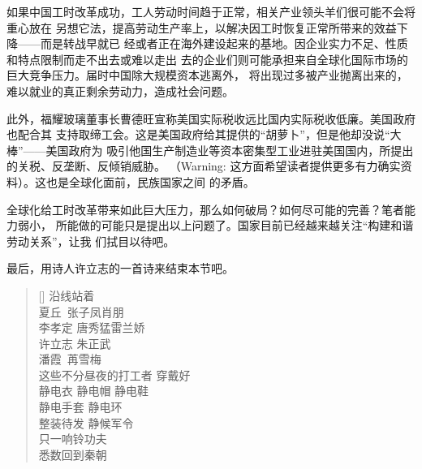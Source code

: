 如果中国工时改革成功，工人劳动时间趋于正常，相关产业领头羊们很可能不会将重心放在
另想它法，提高劳动生产率上，以解决因工时恢复正常所带来的效益下降——而是转战早就已
经或者正在海外建设起来的基地。因企业实力不足、性质和特点限制而走不出去或难以走出
去的企业们则可能承担来自全球化国际市场的巨大竞争压力。届时中国除大规模资本逃离外，
将出现过多被产业抛离出来的，难以就业的真正剩余劳动力，造成社会问题。

此外，福耀玻璃董事长曹德旺宣称美国实际税收远比国内实际税收低廉。美国政府也配合其
支持取缔工会。这是美国政府给其提供的“胡萝卜”，但是他却没说“大棒”——美国政府为
吸引他国生产制造业等资本密集型工业进驻美国国内，所提出的关税、反垄断、反倾销威胁。
（Warning: 这方面希望读者提供更多有力确实资料）。这也是全球化面前，民族国家之间
的矛盾。

全球化给工时改革带来如此巨大压力，那么如何破局？如何尽可能的完善？笔者能力弱小，
所能做的可能只是提出以上问题了。国家目前已经越来越关注“构建和谐劳动关系”，让我
们拭目以待吧。

最后，用诗人许立志的一首诗来结束本节吧。

\settowidth{\versewidth}{Than Tycho Brahe， or Erra Pater:}
\begin{verse}[\versewidth]
  沿线站着\\
  \qquad 夏丘\ \qquad \quad  张子凤\qquad  肖朋\\
  \qquad 李孝定 \qquad  唐秀猛\qquad  雷兰娇\\
  \qquad 许立志 \qquad  朱正武\qquad \\
  \qquad 潘霞\  \qquad \quad 苒雪梅\\
  这些不分昼夜的打工者 \qquad 穿戴好\\
  \qquad  静电衣 \qquad  静电帽  \quad  静电鞋\\
  \qquad  静电手套 \quad 静电环 \\
  整装待发 \quad 静候军令\\
  只一响铃功夫\\
  悉数回到秦朝
\end{verse}
\newcommand{\attrib}[1]{%
  \nopagebreak{\raggedleft\small #1\par}}
\attrib{许立志 (1990--2014)}


